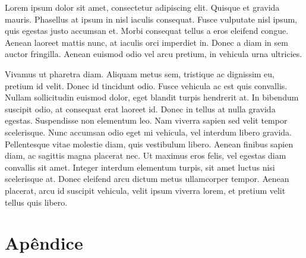 \documentclass[a4paper, 12pt, openright, oneside]{article}
\begin{document}
Lorem ipsum dolor sit amet, consectetur adipiscing elit. Quisque et gravida mauris. Phasellus at ipsum in nisl iaculis consequat. Fusce vulputate nisl ipsum, quis egestas justo accumsan et. Morbi consequat tellus a eros eleifend congue. Aenean laoreet mattis nunc, at iaculis orci imperdiet in. Donec a diam in sem auctor fringilla. Aenean euismod odio vel arcu pretium, in vehicula urna ultricies.

Vivamus ut pharetra diam. Aliquam metus sem, tristique ac dignissim eu, pretium id velit. Donec id tincidunt odio. Fusce vehicula ac est quis convallis. Nullam sollicitudin euismod dolor, eget blandit turpis hendrerit at. In bibendum suscipit odio, at consequat erat laoreet id. Donec in tellus at nulla gravida egestas. Suspendisse non elementum leo. Nam viverra sapien sed velit tempor scelerisque. Nunc accumsan odio eget mi vehicula, vel interdum libero gravida. Pellentesque vitae molestie diam, quis vestibulum libero. Aenean finibus sapien diam, ac sagittis magna placerat nec. Ut maximus eros felis, vel egestas diam convallis sit amet. Integer interdum elementum turpis, sit amet luctus nisi scelerisque at. Donec eleifend arcu dictum metus ullamcorper tempor. Aenean placerat, arcu id suscipit vehicula, velit ipsum viverra lorem, et pretium velit tellus quis libero.

\newpage




\nocite{associaccao1989nbr}
\nocite{marconi2003fundamentos}




\newpage

\section{Apêndice}
\end{document}
